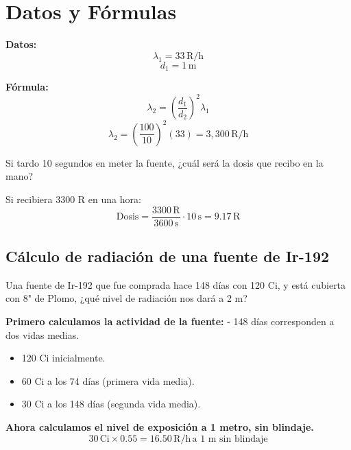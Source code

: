 \section*{Datos y Fórmulas}

\textbf{Datos:}
\begin{equation}
    \lambda_1 = 33 \, \text{R/h}
\end{equation}
\begin{equation}
    d_1 = 1 \, \text{m}
\end{equation}

\textbf{Fórmula:}
\begin{equation}
    \lambda_2 = \left(\frac{d_1}{d_2}\right)^2 \lambda_1
\end{equation}
\begin{equation}
    \lambda_2 = \left(\frac{100}{10}\right)^2 (33) = 3,300 \, \text{R/h}
\end{equation}

Si tardo 10 segundos en meter la fuente, ¿cuál será la dosis que recibo en la mano?

Si recibiera 3300 R en una hora:
\begin{equation}
    \text{Dosis} = \frac{3300 \, \text{R}}{3600 \, \text{s}} \cdot 10 \, \text{s} = 9.17 \, \text{R}
\end{equation}

\subsection*{Cálculo de radiación de una fuente de Ir-192}
Una fuente de Ir-192 que fue comprada hace 148 días con 120 Ci, y está cubierta con 8" de Plomo, ¿qué nivel de radiación nos dará a 2 m?

\textbf{Primero calculamos la actividad de la fuente:}
- 148 días corresponden a dos vidas medias.
\begin{itemize}
    \item[$\circ$] 120 Ci inicialmente.
    \item[$\circ$] 60 Ci a los 74 días (primera vida media).
    \item[$\circ$] 30 Ci a los 148 días (segunda vida media).
\end{itemize}

\textbf{Ahora calculamos el nivel de exposición a 1 metro, sin blindaje.}
\begin{equation}
    30 \, \text{Ci} \times 0.55 = 16.50 \, \text{R/h} \, \text{a 1 m sin blindaje}
\end{equation}

